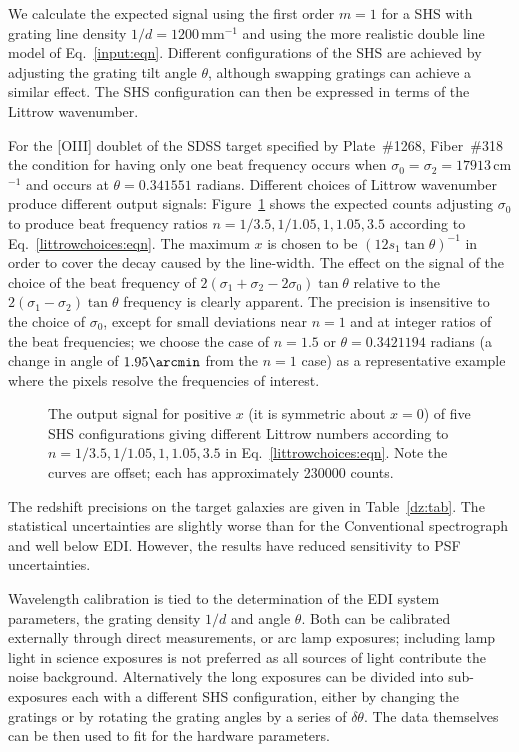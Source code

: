 \documentclass[preprint2, 10pt]{aastex}
\begin{document}
We calculate the expected signal using the first order $m=1$ for a SHS with grating line density $1/d=1200$\,mm$^{-1}$
and using the more realistic double line model of Eq.~\ref{input:eqn}. 
Different configurations of the SHS are achieved by adjusting the grating tilt angle $\theta$, although swapping
gratings can achieve a similar effect.
The SHS configuration can then be expressed in terms of the Littrow wavenumber.

For the [OIII] doublet of the
SDSS target specified by Plate~\#1268, Fiber~\#318 
the condition for having only one beat frequency occurs when $\sigma_0=\sigma_2=17913$\,cm$^{-1}$ and
occurs at $\theta=0.341551$ radians.
Different choices of Littrow wavenumber
produce different output signals:
Figure~\ref{shscounts:fig} shows the expected counts adjusting $\sigma_0$ to produce beat frequency ratios
$n=1/3.5,1/1.05,1,1.05,3.5$ according to Eq.~\ref{littrowchoices:eqn}.
The maximum $x$ is chosen to be $(12s_1\tan{\theta})^{-1}$ in order to cover the decay caused by the line-width.
The effect on the signal
of the choice of the beat frequency of $2(\sigma_1+\sigma_2-2\sigma_0)\tan{\theta}$ relative to the $2(\sigma_1-\sigma_2)\tan{\theta}$ frequency
is clearly apparent.
The precision is insensitive to the choice of $\sigma_0$, except
for small deviations near $n=1$ and at integer ratios of the beat frequencies; we choose
the case of $n=1.5$ or $\theta = 0.3421194$ radians (a change in angle of $1.95 \arcmin$ from the $n=1$ case)
as a representative example where the pixels resolve the frequencies of interest.

\begin{figure}[t]
   \centering
   \caption{The output signal for positive $x$ (it is symmetric about 
$x=0$) of five SHS configurations giving different
   Littrow numbers according to 
   $n=1/3.5, 1/1.05, 1, 1.05, 3.5$  in Eq.~\ref{littrowchoices:eqn}. 
Note the curves are offset; each has approximately 230000 counts. 
   \label{shscounts:fig}}
\end{figure}

The redshift precisions on the target galaxies are given in Table~\ref{dz:tab}.  The statistical uncertainties are slightly worse than for
the Conventional spectrograph and well below EDI.  However, the results have reduced sensitivity to PSF uncertainties.

Wavelength calibration is tied to the determination of the EDI system parameters, the grating density $1/d$ and angle $\theta$.
Both can be calibrated externally through direct measurements, or arc lamp exposures; including lamp light
in science exposures is not preferred as all sources of light contribute the noise background.
Alternatively
the long exposures can be divided into sub-exposures each with a different SHS configuration, either by changing the
gratings or by rotating the grating angles by a series of $\delta \theta$.  The data themselves can be then used to fit for
the hardware parameters.
\end{document}
